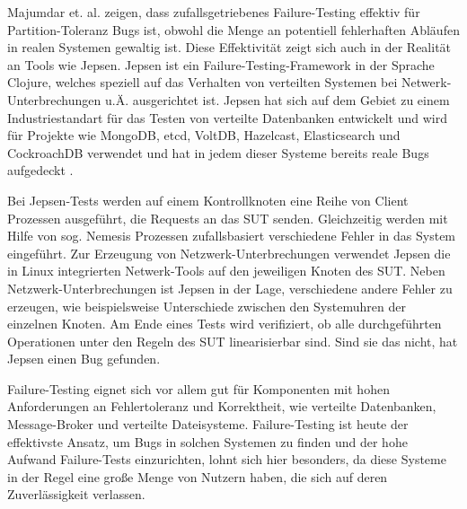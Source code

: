 \documentclass[12pt,a4paper]{report}
\begin{document}
Majumdar et. al. \cite{why_is_random_testing_effective} zeigen, dass zufallsgetriebenes Failure-Testing effektiv für
Partition-Toleranz Bugs ist, obwohl die Menge an potentiell fehlerhaften Abläufen in realen Systemen gewaltig ist. Diese
Effektivität zeigt sich auch in der Realität an Tools wie Jepsen. Jepsen ist ein Failure-Testing-Framework in der Sprache
Clojure, welches speziell auf das Verhalten von verteilten Systemen bei Netwerk-Unterbrechungen u.Ä. ausgerichtet ist. Jepsen hat
sich auf dem Gebiet zu einem Industriestandart für das Testen von verteilte Datenbanken entwickelt \cite{abstracting_the_geniuses}
und wird für Projekte wie MongoDB, etcd, VoltDB, Hazelcast, Elasticsearch und CockroachDB verwendet und hat in jedem dieser
Systeme bereits reale Bugs aufgedeckt \cite{jepsen_analyses}.

Bei Jepsen-Tests werden auf einem Kontrollknoten eine Reihe von Client Prozessen ausgeführt, die Requests an das SUT senden.
Gleichzeitig werden mit Hilfe von sog. Nemesis Prozessen zufallsbasiert verschiedene Fehler in das System eingeführt. Zur
Erzeugung von Netzwerk-Unterbrechungen verwendet Jepsen die in Linux integrierten Netwerk-Tools auf den jeweiligen Knoten des SUT.
Neben Netzwerk-Unterbrechungen ist Jepsen in der Lage, verschiedene andere Fehler zu erzeugen, wie beispielsweise Unterschiede
zwischen den Systemuhren der einzelnen Knoten.  Am Ende eines Tests wird verifiziert, ob alle durchgeführten Operationen unter den
Regeln des SUT linearisierbar sind. Sind sie das nicht, hat Jepsen einen Bug gefunden. \cite{jepsen_github}

Failure-Testing eignet sich vor allem gut für Komponenten mit hohen Anforderungen an Fehlertoleranz und Korrektheit, wie verteilte
Datenbanken, Message-Broker und verteilte Dateisysteme. Failure-Testing ist heute der effektivste Ansatz, um Bugs in solchen
Systemen zu finden \cite{abstracting_the_geniuses} und der hohe Aufwand Failure-Tests einzurichten, lohnt sich hier besonders, da
diese Systeme in der Regel eine große Menge von Nutzern haben, die sich auf deren Zuverlässigkeit verlassen.
\end{document}
